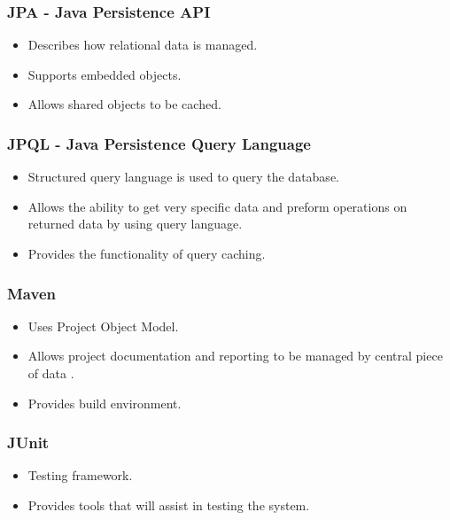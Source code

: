 \documentclass[12pt, oneside]{article}
\begin{document}
		\subsubsection{JPA - Java Persistence API}
			\begin{itemize}
				\item Describes how relational data is managed.
				\item Supports embedded objects.
				\item Allows shared objects to be cached.
			\end{itemize}
			
		\subsubsection{JPQL - Java Persistence Query Language}
			\begin{itemize}
				\item Structured query language is used to query the database.
				\item Allows the ability to get very specific data and preform operations on returned data by using query language.
				\item Provides the functionality of query caching.
			\end{itemize}						
		
		\subsubsection{Maven}
			\begin{itemize}
				 \item Uses Project Object Model.
				 \item Allows project documentation and reporting to be managed by central piece of data .
				 \item Provides build environment.
			\end{itemize}
			\subsubsection{JUnit}
			\begin{itemize}
				 \item Testing framework.
				 \item Provides tools that will assist in testing the system.
			\end{itemize}
\end{document}
